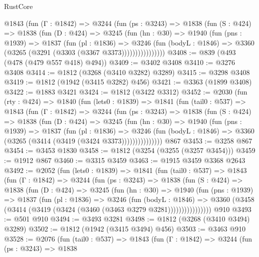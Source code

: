 \begin{lexlean}{RustCore}
\begin{coremodule}
          @1843
            (fun (Γ : @1842) =>
            @3244
              (fun (ps : @3243) =>
              @1838
                (fun (S : @424) =>
                @1838
                  (fun (D : @424) =>
                  @3245
                    (fun (hn : @30) =>
                    @1940
                      (fun (pns : @1939) =>
                      @1837
                        (fun (pl : @1836) =>
                        @3246
                          (fun (bodyL : @1846) =>
                          @3360 (@3265 (@3291 (@3303 (@3367 @3373))))))))))))))))
@3408 := @839 (@493 (@478 (@479 @557 @418) @494))
@3409 := @3402 @3408
@3410 := @3276 @3408
@3414 := @1812 (@3268 (@3410 @3282) @3289)
@3415 := @3298 @3408
@3419 := @1812 (@1942 (@3415 @3282) @456)
@3421 := @3363 (@1899 @3408)
@3422 := @1883 @3421
@3424 := @1812 (@3422 @3312)
@3452 := @2030
    (fun (rty : @424) =>
    @1840
      (fun (lets0 : @1839) =>
      @1841
        (fun (tail0 : @537) =>
        @1843
          (fun (Γ : @1842) =>
          @3244
            (fun (ps : @3243) =>
            @1838
              (fun (S : @424) =>
              @1838
                (fun (D : @424) =>
                @3245
                  (fun (hn : @30) =>
                  @1940
                    (fun (pns : @1939) =>
                    @1837
                      (fun (pl : @1836) =>
                      @3246
                        (fun (bodyL : @1846) =>
                        @3360 (@3265 (@3414 (@3419 (@3424 @3373)))))))))))))))
    @867
@3453 := @3258 @867
@3454 := @3453 @1830
@3458 := @1812 (@3254 (@3255 (@3257 @3454)))
@3459 := @1912 @867
@3460 := @3315 @3459
@3463 := @1915 @3459 @3368 @2643
@3492 := @2052
    (fun (lets0 : @1839) =>
    @1841
      (fun (tail0 : @537) =>
      @1843
        (fun (Γ : @1842) =>
        @3244
          (fun (ps : @3243) =>
          @1838
            (fun (S : @424) =>
            @1838
              (fun (D : @424) =>
              @3245
                (fun (hn : @30) =>
                @1940
                  (fun (pns : @1939) =>
                  @1837
                    (fun (pl : @1836) =>
                    @3246
                      (fun (bodyL : @1846) =>
                      @3360 (@3458 (@3414 (@3419 (@3424 (@3460 (@3463 @3279 @3281))))))))))))))))
    @910
@3493 := @501 @910
@3494 := @3493 @3281
@3498 := @1812 (@3268 (@3410 @3494) @3289)
@3502 := @1812 (@1942 (@3415 @3494) @456)
@3503 := @3463 @910
@3528 := @2076
    (fun (tail0 : @537) =>
    @1843
      (fun (Γ : @1842) =>
      @3244
        (fun (ps : @3243) =>
        @1838

\end{coremodule}
\end{lexlean}
